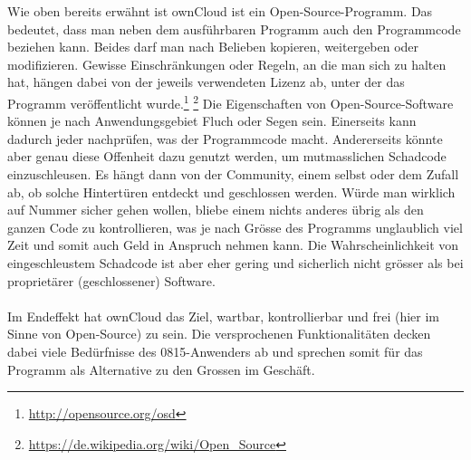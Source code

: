 Wie oben bereits erwähnt ist ownCloud ist ein Open-Source-Programm. Das bedeutet, dass man neben dem ausführbaren Programm auch den Programmcode beziehen kann. Beides darf man nach Belieben kopieren, weitergeben oder modifizieren. Gewisse Einschränkungen oder Regeln, an die man sich zu halten hat, hängen dabei von der jeweils verwendeten Lizenz ab, unter der das Programm veröffentlicht wurde.\footnote{\url{http://opensource.org/osd}} \footnote{\url{https://de.wikipedia.org/wiki/Open_Source}}
Die Eigenschaften von Open-Source-Software können je nach Anwendungsgebiet Fluch oder Segen sein. Einerseits kann dadurch jeder nachprüfen, was der Programmcode macht. Andererseits könnte aber genau diese Offenheit dazu genutzt werden, um mutmasslichen Schadcode einzuschleusen. Es hängt dann von der Community, einem selbst oder dem Zufall ab, ob solche Hintertüren entdeckt und geschlossen werden. Würde man wirklich auf Nummer sicher gehen wollen, bliebe einem nichts anderes übrig als den ganzen Code zu kontrollieren, was je nach Grösse des Programms unglaublich viel Zeit und somit auch Geld in Anspruch nehmen kann. Die Wahrscheinlichkeit von eingeschleustem Schadcode ist aber eher gering und sicherlich nicht grösser als bei proprietärer (geschlossener) Software.
\\
\\
Im Endeffekt hat ownCloud das Ziel, wartbar, kontrollierbar und frei (hier im Sinne von Open-Source) zu sein. Die versprochenen Funktionalitäten decken dabei viele Bedürfnisse des 0815-Anwenders ab und sprechen somit für das Programm als Alternative zu den Grossen im Geschäft.

